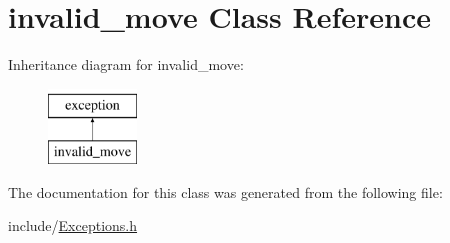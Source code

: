 \hypertarget{classinvalid__move}{}\section{invalid\+\_\+move Class Reference}
\label{classinvalid__move}
Inheritance diagram for invalid\+\_\+move\+:\begin{figure}[H]
\begin{center}
\leavevmode
\includegraphics[height=2.000000cm]{classinvalid__move}
\end{center}
\end{figure}


The documentation for this class was generated from the following file\+:\begin{DoxyCompactItemize}
\item 
include/\hyperlink{_exceptions_8h}{Exceptions.\+h}\end{DoxyCompactItemize}
